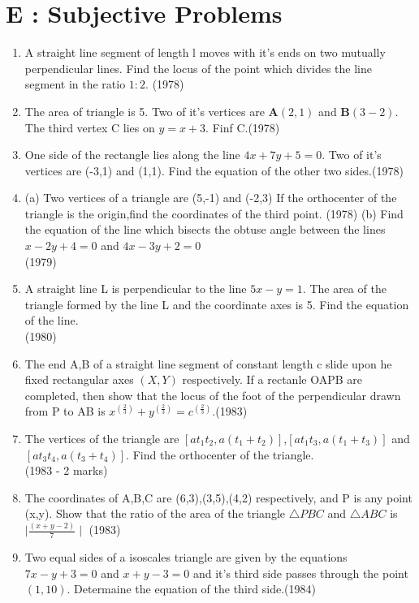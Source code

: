 \documentclass[12pt]{article}
\let\vec\mathbf
\begin{document}
\section*{E  :  Subjective Problems}

\begin{enumerate}
\item  A straight line segment of length l moves with it's ends on two mutually perpendicular lines. Find the locus of the point which divides the line segment in the ratio $1:2$. (1978)
\item The area of triangle is 5. Two of it's vertices are $\vec{A}(2,1)$ and $\vec{B}(3-2)$. The third vertex C lies on $y=x+3$. Finf C.(1978)
\item One side of the rectangle lies along the line $4x+7y+5=0$. Two of it's vertices are (-3,1) and (1,1). Find the equation of the other two sides.(1978)
\item(a) Two vertices of a triangle are (5,-1) and (-2,3) If the orthocenter of the triangle is the origin,find the coordinates of the third point. (1978)
(b) Find the equation of the line which bisects the obtuse angle between the lines $x-2y+4=0$ and $4x-3y+2=0$\\ (1979)
\item  A straight line L is perpendicular to the line $5x-y=1$. The area of the triangle formed by the line L and the coordinate axes is 5. Find the equation of the line.\\ (1980)
\item The end A,B of a straight line segment of constant length c slide upon he fixed rectangular axes $(X,Y)$ respectively. If a rectanle OAPB are completed, then show that the locus of the foot of the perpendicular drawn from P to AB is $x^(\frac{2}{3})+y^(\frac{2}{3})=c^(\frac{2}{3})$.(1983)\\
\item The vertices of the triangle are $[at_1t_2,a(t_1+t_2)]$,$[at_1t_3,a(t_1+t_3)]$ and $[at_3t_4,a(t_3+t_4)]$. Find the orthocenter of the triangle.\\ (1983 - 2 marks)
\item The coordinates of A,B,C are  (6,3),(3,5),(4,2) respectively, and P is any point (x,y). Show that the ratio of the area of the triangle $\triangle PBC$ and $\triangle ABC $ is $\mid\frac{(x+y-2)}{7}\mid$ (1983)\\
\item Two equal sides of a isoscales triangle are given by the equations $7x-y+3=0$ and $x+y-3=0$ and it's third side passes through the point $(1,10)$. Determaine the equation of the third side.(1984)\\

\end{enumerate}
\end{document}

